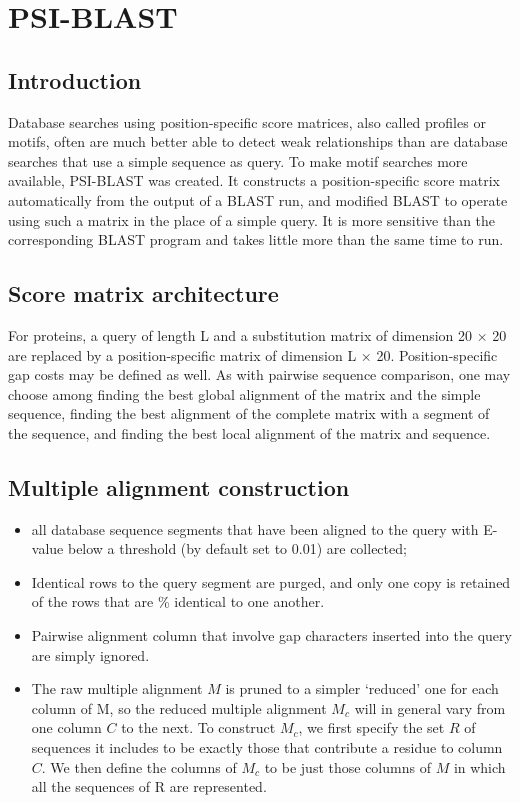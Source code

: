     \section{PSI-BLAST}

        \subsection{Introduction}
        Database searches using position-specific score matrices, also called profiles or motifs, often are much better able to detect weak relationships than are database searches that use a simple sequence as query. To make motif searches more available, PSI-BLAST was created. It constructs a position-specific score matrix automatically from the output of a BLAST run, and modified BLAST to operate using such a matrix in the place of a simple query. It is more sensitive than the corresponding BLAST program and takes little more than the same time to run.
        \subsection{Score matrix architecture}
        For proteins, a query of length L and a substitution matrix of dimension 20 × 20 are replaced by a position-specific matrix of dimension L × 20. Position-specific gap costs may be defined as well. As with pairwise sequence comparison, one may choose among finding the best global alignment of the matrix and the simple sequence, finding the best alignment of the complete matrix with a segment of the sequence, and finding the best local alignment of the matrix and sequence.

        \subsection{Multiple alignment construction}
        \begin{itemize}
            \item all database sequence segments that have been aligned to the query with E-value below a threshold (by default set to 0.01) are collected;
            \item Identical rows to the query segment are purged, and only one copy is retained of the rows that are \% identical to one another.
            \item Pairwise alignment column that involve gap characters inserted into the query are simply ignored.
            \item  The raw multiple alignment $M$ is pruned to a simpler ‘reduced’ one for each column of M, so the reduced multiple alignment $M_c$ will in general vary from one column $C$ to the next. To construct $M_c$, we first specify the set $R$ of sequences it includes to be exactly those that contribute a residue to column $C$. We then define the columns of $M_c$ to be just those columns of $M$ in which all the sequences of R are represented.
        \end{itemize}

